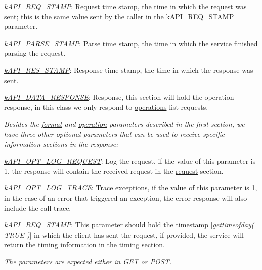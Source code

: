 {\begin{DoxyItemize}
\begin{DoxyItemize}
\item {\itshape \hyperlink{}{k\-A\-P\-I\-\_\-\-R\-E\-Q\-\_\-\-S\-T\-A\-M\-P}}\-: Request time stamp, the time in which the request was sent; this is the same value sent by the caller in the \hyperlink{}{k\-A\-P\-I\-\_\-\-R\-E\-Q\-\_\-\-S\-T\-A\-M\-P} parameter. 
\item {\itshape \hyperlink{}{k\-A\-P\-I\-\_\-\-P\-A\-R\-S\-E\-\_\-\-S\-T\-A\-M\-P}}\-: Parse time stamp, the time in which the service finished parsing the request. 
\item {\itshape \hyperlink{}{k\-A\-P\-I\-\_\-\-R\-E\-S\-\_\-\-S\-T\-A\-M\-P}}\-: Response time stamp, the time in which the response was sent. 
\end{DoxyItemize}
\item {\itshape \hyperlink{}{k\-A\-P\-I\-\_\-\-D\-A\-T\-A\-\_\-\-R\-E\-S\-P\-O\-N\-S\-E}}\-: Response, this section will hold the operation response, in this class we only respond to \hyperlink{}{operations} list requests. 
\end{DoxyItemize}}

{\itshape Besides the \hyperlink{}{format} and \hyperlink{}{operation} parameters described in the first section, we have three other optional parameters that can be used to receive specific information sections in the response\-:}

{\itshape 
\begin{DoxyItemize}
\item {\itshape \hyperlink{}{k\-A\-P\-I\-\_\-\-O\-P\-T\-\_\-\-L\-O\-G\-\_\-\-R\-E\-Q\-U\-E\-S\-T}}\-: Log the request, if the value of this parameter is 1, the response will contain the received request in the \hyperlink{}{request} section. 
\item {\itshape \hyperlink{}{k\-A\-P\-I\-\_\-\-O\-P\-T\-\_\-\-L\-O\-G\-\_\-\-T\-R\-A\-C\-E}}\-: Trace exceptions, if the value of this parameter is 1, in the case of an error that triggered an exception, the error response will also include the call trace. 
\item {\itshape \hyperlink{}{k\-A\-P\-I\-\_\-\-R\-E\-Q\-\_\-\-S\-T\-A\-M\-P}}\-: This parameter should hold the timestamp \mbox{[}{\itshape gettimeofday( T\-R\-U\-E )}\mbox{]} in which the client has sent the request, if provided, the service will return the timing information in the \hyperlink{}{timing} section. 
\end{DoxyItemize}}

{\itshape The parameters are expected either in {\itshape G\-E\-T} or {\itshape P\-O\-S\-T}.}

